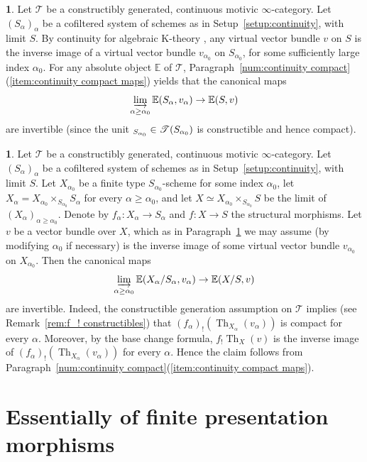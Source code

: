 \documentclass[11pt]{article}
\makeatletter
\numberwithin{equation}{section}\renewcommand{\encodingdefault}{TU}
\DeclareRobustCommand{\mathbbm}[1]{\csname jepbb@#1\endcsname}
\newcommand{\T}{\mathscr T}
\newcommand{\E}{\mathbb E}
\newcommand{\un}{\mathbbm 1}
\DeclareMathOperator{\ilim}{\varinjlim}
\DeclareMathOperator{\Th}{Th}
\theoremstyle{remark}
\theoremstyle{definition}
\newtheorem{num}[thm]{}
\numberwithin{equation}{thm}
\makeatother
\begin{document}
\begin{num}\label{num:continuity cohomology}
Let $\T$ be a constructibly generated, continuous motivic $\infty$-category.
Let $(S_\alpha)_\alpha$ be a cofiltered system of schemes as in Setup~\ref{setup:continuity}, with limit $S$.
By continuity for algebraic K-theory \cite[Th.\,7.2]{TT}, any virtual vector bundle $v$ on $S$ is the inverse image of a virtual vector bundle $v_{\alpha_0}$ on $S_{\alpha_0}$, for some sufficiently large index $\alpha_0$.
For any absolute object $\E$ of $\T$, Paragraph~\ref{num:continuity compact}(\ref{item:continuity compact maps}) yields that the canonical maps
\[
\ilim_{\alpha\ge\alpha_0} \E(S_{\alpha}, v_{\alpha})
\to \E(S, v)
\]
are invertible (since the unit $\un_{S_{\alpha_0}} \in \T(S_{\alpha_0})$ is constructible and hence compact).
\end{num}

\begin{num}\label{num:continuity bivariant}
Let $\T$ be a constructibly generated, continuous motivic $\infty$-category.
Let $(S_\alpha)_\alpha$ be a cofiltered system of schemes as in Setup~\ref{setup:continuity}, with limit $S$.
Let $X_{\alpha_0}$ be a finite type $S_{\alpha_0}$-scheme for some index $\alpha_0$, let $X_\alpha = X_{\alpha_0} \times_{S_{\alpha_0}} S_\alpha$ for every $\alpha\ge\alpha_0$, and let $X \simeq X_{\alpha_0} \times_{S_{\alpha_0}} S$ be the limit of $(X_\alpha)_{\alpha\ge\alpha_0}$.
Denote by $f_\alpha : X_\alpha \to S_\alpha$ and $f : X \to S$ the structural morphisms.
Let $v$ be a vector bundle over $X$, which as in Paragraph~\ref{num:continuity cohomology} we may assume (by modifying $\alpha_0$ if necessary) is the inverse image of some virtual vector bundle $v_{\alpha_0}$ on $X_{\alpha_0}$.
Then the canonical maps
\[
\ilim_{\alpha\ge\alpha_0} \E(X_\alpha/S_\alpha, v_\alpha)
\to \E(X/S, v)
\]
are invertible.
Indeed, the constructible generation assumption on $\T$ implies (see Remark~\ref{rem:f_! constructibles}) that $(f_\alpha)_!(\Th_{X_\alpha}(v_\alpha))$ is compact for every $\alpha$.
Moreover, by the base change formula, $f_!\Th_X(v)$ is the inverse image of $(f_\alpha)_!(\Th_{X_\alpha}(v_\alpha))$ for every $\alpha$.
Hence the claim follows from Paragraph~\ref{num:continuity compact}(\ref{item:continuity compact maps}).
\end{num}

\section{Essentially of finite presentation morphisms}
\label{apd:efp}
\end{document}
